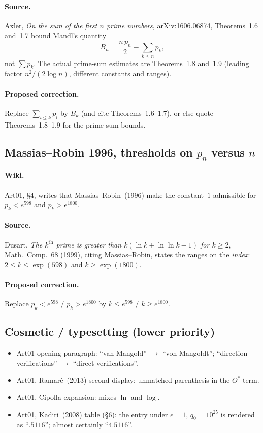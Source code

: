 \documentclass[11pt,a4paper]{article}
\begin{document}
\paragraph{Source.}
Axler, \emph{On the sum of the first $n$ prime numbers},
arXiv:1606.06874, Theorems~1.6 and~1.7 bound Mandl's quantity
\[
B_n=\frac{n\,p_n}{2}-\sum_{k\le n}p_k,
\]
not $\sum p_k$.  The actual prime-sum estimates are Theorems~1.8 and~1.9
(leading factor $n^2/(2\log n)$, different constants and ranges).
\paragraph{Proposed correction.}
Replace $\sum_{i\le k}p_i$ by $B_k$ (and cite Theorems~1.6--1.7), or else
quote Theorems~1.8--1.9 for the prime-sum bounds.

\subsection{Massias--Robin 1996, thresholds on $p_n$ versus $n$}
\label{err:massias-robin-index}
\paragraph{Wiki.}
Art01, \S4, writes that Massias--Robin~(1996) make the constant~$1$ admissible
for $p_k < e^{598}$ and $p_k > e^{1800}$.
\paragraph{Source.}
Dusart, \emph{The $k^{\mathrm{th}}$ prime is greater than
$k(\ln k+\ln\ln k-1)$ for $k\ge 2$}, Math.\ Comp.\ 68 (1999), citing
Massias--Robin, states the ranges on the \emph{index}:
$2\le k\le\exp(598)$ and $k\ge\exp(1800)$.
\paragraph{Proposed correction.}
Replace $p_k < e^{598}$ / $p_k > e^{1800}$ by
$k\le e^{598}$ / $k\ge e^{1800}$.

\subsection{Cosmetic / typesetting (lower priority)}
\begin{itemize}[leftmargin=*]
\item Art01 opening paragraph: ``van Mangold'' $\to$ ``von Mangoldt'';
  ``direction verifications'' $\to$ ``direct verifications''.
\item Art01, Ramaré~(2013) second display: unmatched parenthesis in the
  $O^*$ term.
\item Art01, Cipolla expansion: mixes $\ln$ and $\log$.
\item Art01, Kadiri~(2008) table (\S6): the entry under
  $\epsilon=1$, $q_0=10^{25}$ is rendered as ``$.5116$''; almost certainly
  ``$4.5116$''.
\end{itemize}
\end{document}

